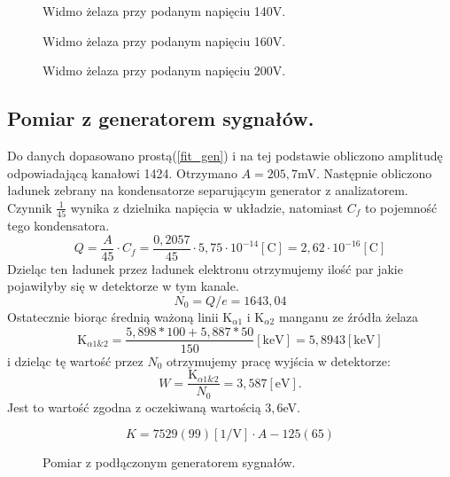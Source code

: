 \documentclass[11pt,a4paper]{article}
\begin{document}
\begin{figure}[H]
\centering
\resizebox{.8\linewidth}{!}{}
\caption{Widmo żelaza przy podanym napięciu 140V.}
\label{fig1}
\end{figure}

\begin{figure}[H]
\centering
\resizebox{.8\linewidth}{!}{}
\caption{Widmo żelaza przy podanym napięciu 160V.}
\label{fig1}
\end{figure}

\begin{figure}[H]
\centering
\resizebox{.8\linewidth}{!}{}
\caption{Widmo żelaza przy podanym napięciu 200V.}
\label{fig1}
\end{figure}

\subsection{Pomiar z generatorem sygnałów.}
Do danych dopasowano prostą(\ref{fit_gen}) i na tej podstawie obliczono amplitudę odpowiadającą kanałowi 1424. 
Otrzymano $A = 205,7$mV.
Następnie obliczono ładunek zebrany na kondensatorze separującym generator z analizatorem. 
Czynnik $\frac{1}{45}$ wynika z dzielnika napięcia w układzie, natomiast $C_f$ to pojemność tego kondensatora.
$$
Q=\frac{A}{45} \cdot C_f = \frac{0,2057}{45}\cdot 5,75\cdot 10^{-14} [\text{C}] = 2,62\cdot 10^{-16} [\text{C}]
$$
Dzieląc ten ładunek przez ładunek elektronu otrzymujemy ilość par jakie pojawiłyby się w detektorze w tym kanale.
$$
N_0 = Q/e = 1643,04
$$
Ostatecznie biorąc średnią ważoną linii K$_{\alpha 1}$ i K$_{\alpha 2}$ manganu ze źródła żelaza
$$
\text{K}_{\alpha 1\&2} = \frac{5,898*100 + 5,887*50}{150} [\text{keV}]=5,8943 [\text{keV}]
$$
i dzieląc tę wartość przez $N_0$ otrzymujemy pracę wyjścia w detektorze:
\begin{equation}
	W = \frac{\text{K}_{\alpha 1\&2}}{N_0} = 3,587 [\text{eV}].
\end{equation}
Jest to wartość zgodna z oczekiwaną wartością $3,6$eV.

\begin{equation}
	K = 7529(99)[\text{1/V}] \cdot A -125(65)
	\label{fit_gen}
\end{equation}
\begin{figure}[H]
\centering
\resizebox{.8\linewidth}{!}{}
\caption{Pomiar z podłączonym generatorem sygnałów.}
\label{fig1}
\end{figure}
\end{document}
